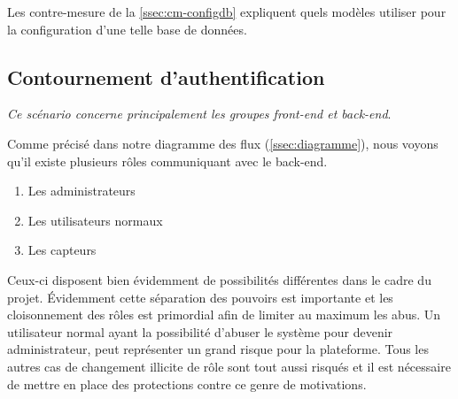 \documentclass[12pt]{article}
\begin{document}
Les contre-mesure de la \autoref{ssec:cm-configdb} expliquent quels modèles utiliser pour la configuration d'une telle base de données.


\clearpage
\subsection{Contournement d'authentification}

\emph{Ce scénario concerne principalement les groupes front-end et back-end}.
\medskip

Comme précisé dans notre diagramme des flux (\autoref{ssec:diagramme}), nous voyons qu'il existe plusieurs rôles communiquant avec le back-end.

\begin{enumerate}
\item Les administrateurs
\item Les utilisateurs normaux
\item Les capteurs
\end{enumerate}

Ceux-ci disposent bien évidemment de possibilités différentes dans le cadre du projet. Évidemment cette séparation des pouvoirs est importante et les cloisonnement des rôles est primordial afin de limiter au maximum les abus. Un utilisateur normal ayant la possibilité d'abuser le système pour devenir administrateur, peut représenter un grand risque pour la plateforme. Tous les autres cas de changement illicite de rôle sont tout aussi risqués et il est nécessaire de mettre en place des protections contre ce genre de motivations.
\medskip
\end{document}
